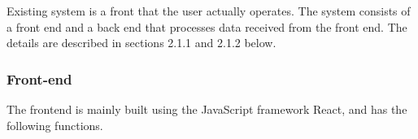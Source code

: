 
Existing system is a front that the user actually operates. The system consists of a front end and a back end that processes data received from the front end.
The details are described in sections 2.1.1 and 2.1.2 below.

\subsubsection{Front-end}
The frontend is mainly built using the JavaScript framework React, and has the following functions.

